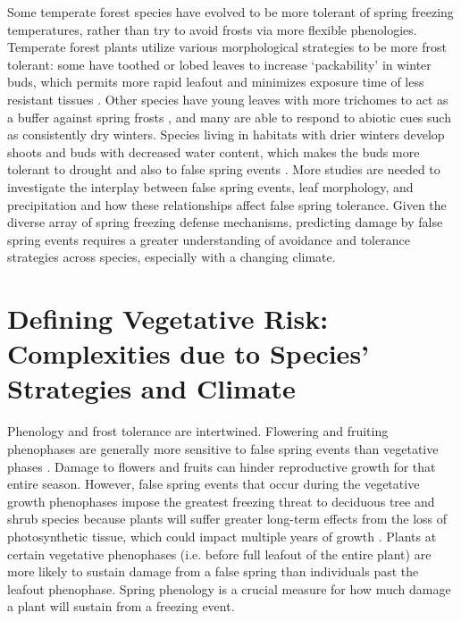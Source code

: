 \documentclass{article}\usepackage[]{graphicx}\usepackage[]{color}
\begin{document}
Some temperate forest species have evolved to be more tolerant of spring freezing temperatures, rather than try to avoid frosts via more flexible phenologies. Temperate forest plants utilize various morphological strategies to be more frost tolerant: some have toothed or lobed leaves to increase `packability' in winter buds, which permits more rapid leafout and minimizes exposure time of less resistant tissues \citep{Edwards2017}. Other species have young leaves with more trichomes to act as a buffer against spring frosts \citep{Agrawal2004}, and many are able to respond to abiotic cues such as consistently dry winters. Species living in habitats with drier winters develop shoots and buds with decreased water content, which makes the buds more tolerant to drought and also to false spring events \citep{Beck2007, Morin2007, Nielsen2009, Poirier2010, Kathke2011, Hofmann2015}. More studies are needed to investigate the interplay between false spring events, leaf morphology, and precipitation and how these relationships affect false spring tolerance. Given the diverse array of spring freezing defense mechanisms, predicting damage by false spring events requires a greater understanding of avoidance and tolerance strategies across species, especially with a changing climate.

\section {Defining Vegetative Risk: Complexities due to Species' Strategies and Climate}
Phenology and frost tolerance are intertwined. Flowering and fruiting phenophases are generally more sensitive to false spring events than vegetative phases \citep{Augspurger2009, Lenz2013}. Damage to flowers and fruits can hinder reproductive growth for that entire season. However, false spring events that occur during the vegetative growth phenophases impose the greatest freezing threat to deciduous tree and shrub species because plants will suffer greater long-term effects from the loss of photosynthetic tissue, which could impact multiple years of growth \citep{Sakai1987}. Plants at certain vegetative phenophases (i.e. before full leafout of the entire plant) are more likely to sustain damage from a false spring than individuals past the leafout phenophase. Spring phenology is a crucial measure for how much damage a plant will sustain from a freezing event.
\end{document}
